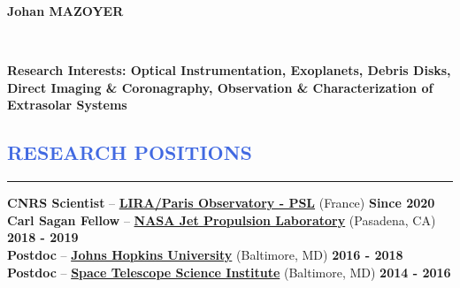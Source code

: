 \documentclass[11pt]{article}
\begin{document}
\lhead[]{}
\lfoot{\textcolor{Gray}{CV last update: \yeardate\today}}

\begin{huge}
\noindent\textbf{Johan MAZOYER}
\end{huge}\\

\vspace{-0.2cm}

\textbf{Research Interests: Optical Instrumentation, Exoplanets, Debris Disks, Direct Imaging \& Coronagraphy,
Observation \& Characterization of Extrasolar Systems}\\


\vspace{-1.2cm}
\textcolor{RoyalBlue}{\section{\large RESEARCH POSITIONS}
\vspace{-0.35cm}\hrule}
\vspace{0.4cm}

\textbf{CNRS Scientist} --
\href{https://observatoiredeparis.psl.eu/?lang=en}{\textbf{LIRA/Paris Observatory - PSL}} (France)
\hfill     	 { \bf Since 2020}\\

\vspace{-0.22cm}
\textbf{Carl Sagan Fellow} --
\href{https://www.jpl.nasa.gov/}{\textbf{NASA Jet Propulsion Laboratory}} (Pasadena, CA)
\hfill      { \bf 2018 - 2019}\\

\vspace{-0.22cm}
\textbf{Postdoc} --
\href{https://physics-astronomy.jhu.edu/}{\textbf{Johns Hopkins University}} (Baltimore, MD)
\hfill   	 { \bf 2016 - 2018}\\

\vspace{-0.22cm}
\textbf{Postdoc} --
{\href{https://www.stsci.edu/}{\textbf{Space Telescope Science Institute}}} (Baltimore, MD)
\hfill        { \bf 2014 - 2016}\\
\end{document}
